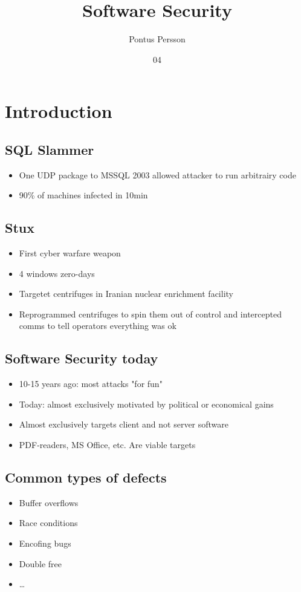 \documentclass[course, english]{Notes}
\title{Software Security}
\author{Pontus Persson}
\date{04}{11}{2015}
\begin{document}
\section{Introduction}
\subsection{SQL Slammer}
\begin{itemize}
	\item One UDP package to MSSQL 2003 allowed attacker to run arbitrairy code
	\item 90\% of machines infected in 10min
\end{itemize}
\subsection{Stux}
\begin{itemize}
	\item First cyber warfare weapon
	\item 4 windows zero-days
	\item Targetet centrifuges in Iranian nuclear enrichment facility
	\item Reprogrammed centrifuges to spin them out of control and intercepted comms to tell operators everything was ok
\end{itemize}
\subsection{Software Security today}
\begin{itemize}
	\item 10-15 years ago: most attacks "for fun"
	\item Today: almost exclusively motivated by political or economical gains
	\item Almost exclusively targets client and not server software
	\item PDF-readers, MS Office, etc. Are viable targets
\end{itemize}
\subsection{Common types of defects}
\begin{itemize}
	\item Buffer overflows
	\item Race conditions
	\item Encofing bugs
	\item Double free
	\item \ldots
\end{itemize}
\end{document}
